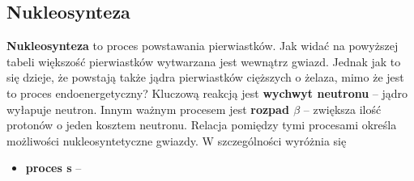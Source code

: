 \documentclass[../index.tex]{subfiles}
\begin{document}
        \subsection{Nukleosynteza}
            \textbf{Nukleosynteza} to proces powstawania pierwiastków. Jak widać na powyższej tabeli większość pierwiastków wytwarzana jest wewnątrz gwiazd. Jednak jak to się dzieje, że powstają także jądra pierwiastków cięższych o żelaza, mimo że jest to proces endoenergetyczny? Kluczową reakcją jest \textbf{wychwyt neutronu} – jądro wyłapuje neutron. Innym ważnym procesem jest \textbf{rozpad \(\beta\)} – zwiększa ilość protonów o jeden kosztem neutronu. Relacja pomiędzy tymi procesami określa możliwości nukleosyntetyczne gwiazdy. W szczególności wyróżnia się
            \begin{itemize}
                \item \textbf{proces s} –
            \end{itemize}
\end{document}
